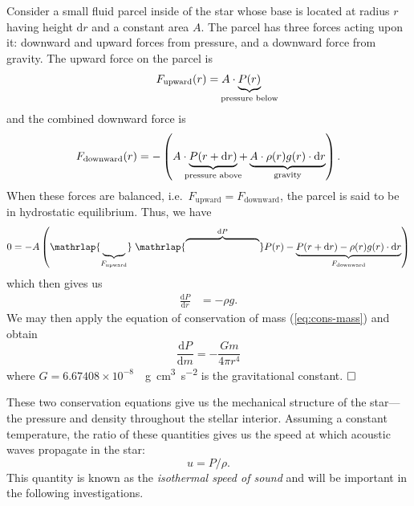 \begin{description}
    Consider a small fluid parcel inside of the star whose base is located at radius $r$ having height ${\text{d}r}$ and a constant area $A$. 
    The parcel has three forces acting upon it: downward and upward forces from pressure, and a downward force from gravity. 
    The upward force on the parcel is 
    \begin{equation}
        F_{\text{upward}} (r) = A \cdot \underbrace{P(r)}_{\makebox[0pt]{\text{\scriptsize pressure below}}}
    \end{equation}
    and the combined downward force is
    \begin{equation}
        F_{\text{downward}} (r)
        = -\left(
            A \cdot \underbrace{P(r+\text{d}r)}_{\makebox[0pt]{\text{\scriptsize pressure above}}} + \underbrace{A \cdot \rho(r) g(r) \cdot \text{d}r}_{\text{gravity}}
        \right).
    \end{equation}
    When these forces are balanced, i.e.~${F_{\text{upward}} = F_{\text{downward}}}$, the parcel is said to be in hydrostatic equilibrium. 
    Thus, we have
    \begin{equation}
        0 = 
        -A\left( 
                \mathrlap{\underbrace{\phantom{\;P(r)}}_{F_{\text{upward}}}}
                \;\mathrlap{\overbrace{\phantom{P(r) - P(r+\text{d}r)}}^{\text{d}P}}
                P(r) - 
                \underbrace{
                    P(r+\text{d}r) - \rho(r) g(r) \cdot \text{d}r
                }_{F_{\text{downward}}}
        \right)
    \end{equation}
    which then gives us
    \begin{align} \label{eq:cons-mom-r}
        \frac{\text{d} P}{\text{d} r} &= -\rho g.
    \end{align}
    We may then apply the equation of conservation of mass (\ref{eq:cons-mass}) and obtain
    \begin{equation} \label{eq:cons-mom} \boxed{
        \frac{\text{d} P}{\text{d} m} = -\frac{Gm}{4\pi r^4}
    }\end{equation}
    where ${G = 6.67408\times 10^{-8}}$~\si{\per\g\cm\cubed\per\square\s} is the gravitational constant. $\hfill\square\;$
    
    These two conservation equations give us the mechanical structure of the star---the pressure and density throughout the stellar interior. 
    Assuming a constant temperature, the ratio of these quantities gives us the speed at which acoustic waves propagate in the star:
    \begin{equation} \label{eq:u}
        u = P/\rho.
    \end{equation}
    This quantity is known as the \emph{isothermal speed of sound} and will be important in the following investigations. 
    

\end{description}

